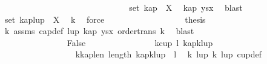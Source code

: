 \begin{isabellebody}
\ \ \ \ \ \ \ \ \ \ \ \ \ \ \isamarkupfalse%
\isanewline
\ \ \ \ \ \ \ \ \ \ \ \ \ \ \isamarkupfalse%
\ {\isachardoublequoteopen}set\ kap\ {\isasymsubseteq}\ X{\isachardoublequoteclose}\ \isamarkupfalse%
\ kap{\isacharparenleft}{\kern0pt}{}{\isacharparenright}{\kern0pt}\ ysx\ \isamarkupfalse%
\ blast\isanewline
\ \ \ \ \ \ \ \ \ \ \ \ \ \ \isamarkupfalse%
\ {\isachardoublequoteopen}set\ {\isacharparenleft}{\kern0pt}kap{\isacharat}{\kern0pt}{\isacharbrackleft}{\kern0pt}lup{\isacharbang}{\kern0pt}{}{\isacharbrackright}{\kern0pt}{\isacharparenright}{\kern0pt}\ {\isasymsubseteq}\ X{\isachardoublequoteclose}\ \isamarkupfalse%
\ k{}\ \isamarkupfalse%
\ force\ \isanewline
\ \ \ \ \ \ \ \ \ \ \ \ \ \ \isamarkupfalse%
\ \isamarkupfalse%
\ {\isacharquery}{\kern0pt}thesis\ \isamarkupfalse%
\ k{}\ assms{\isacharparenleft}{\kern0pt}{}{\isacharparenright}{\kern0pt}\ cap{\isacharunderscore}{\kern0pt}def\ lup\ kap\ ysx\ order{\isacharunderscore}{\kern0pt}trans\ k{}\ \isamarkupfalse%
\ blast\isanewline
\ \ \ \ \ \ \ \ \ \ \ \ \isamarkupfalse%
\isanewline
\ \ \ \ \ \ \ \ \ \ \ \ \ \ \isamarkupfalse%
\ False\isanewline
\ \ \ \ \ \ \ \ \ \ \ \ \ \ \isamarkupfalse%
\ k{}{\isacharcolon}{\kern0pt}{\isachardoublequoteopen}cup\ l\ {\isacharparenleft}{\kern0pt}kap{\isacharbang}{\kern0pt}{\isacharparenleft}{\kern0pt}k{\isacharminus}{\kern0pt}{}{\isacharparenright}{\kern0pt}{\isacharhash}{\kern0pt}lup{\isacharparenright}{\kern0pt}{\isachardoublequoteclose}\isanewline
\ \ \ \ \ \ \ \ \ \ \ \ \ \ \isamarkupfalse%
{\isacharminus}{\kern0pt}\isanewline
\ \ \ \ \ \ \ \ \ \ \ \ \ \ \ \ \isamarkupfalse%
\ k{\isacharunderscore}{\kern0pt}kap{\isacharunderscore}{\kern0pt}len{\isacharcolon}{\kern0pt}\ {\isachardoublequoteopen}length\ {\isacharparenleft}{\kern0pt}kap{\isacharbang}{\kern0pt}{\isacharparenleft}{\kern0pt}k{\isacharminus}{\kern0pt}{}{\isacharparenright}{\kern0pt}{\isacharhash}{\kern0pt}lup{\isacharparenright}{\kern0pt}\ {\isacharequal}{\kern0pt}\ l{\isachardoublequoteclose}\ \isamarkupfalse%
\ k{}\ lup{\isacharparenleft}{\kern0pt}{}{\isacharparenright}{\kern0pt}\ k{}\ lup\ cup{\isacharunderscore}{\kern0pt}def\isanewline

\end{isabellebody}
